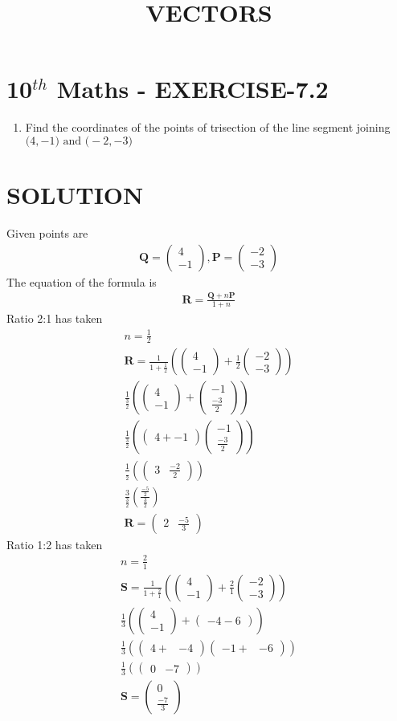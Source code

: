 \documentclass[12pt]{article}
\providecommand{\brak}[1]{\ensuremath{\left(#1\right)}}
\newcommand{\myvec}[1]{\ensuremath{\begin{pmatrix}#1\end{pmatrix}}}
\let\vec\mathbf
\begin{document}
\begin{center}
\title{\textbf{VECTORS}}
\date{\vspace{-5ex}} %
\maketitle
\end{center}

\section{10$^{th}$ Maths - EXERCISE-7.2}

\begin{enumerate}
\item Find the coordinates of the points of trisection of the line segment joining $\vec(4 ,-1) \text{ and } \vec(-2,-3)$ 
\end{enumerate}

\section{SOLUTION}
Given points are
\begin{align}
\vec{Q}=\myvec{4\\ -1} ,
\vec{P}=\myvec{-2\\ -3}
\end{align}
The equation of the formula is
\begin{align}
\vec{R}=\frac{\vec{Q}+n\vec{P}}{1+n}
\end{align}
Ratio 2:1 has taken 
\begin{align}
n=\frac{1}{2}\\
\vec{R}=\frac{1}{1+\frac{1}{2}}\brak{\myvec{4\\-1}+\frac{1}{2}\myvec{-2\\-3}}\\
\frac{1}{\frac{3}{2}}\brak{\myvec{4\\ -1}+\myvec{-1\\ \frac{-3}{2}}}\\
\frac{1}{\frac{3}{2}}\brak{\myvec{4+-1}\myvec{-1\\ \frac{-3}{2}}}\\
\frac{1}{\frac{}{2}}\brak{\myvec{3 & \frac{-2}{2}}}\\
\frac{3}{\frac{3}{2}}\brak{\frac{\frac{-5}{2}}{\frac{3}{2}}}\\
\vec{R}=\myvec{2 & \frac{-5}{3}}
\end{align}
Ratio 1:2 has taken
\begin{align}
n=\frac{2}{1}\\
\vec{S}=\frac{1}{1+\frac{2}{1}}\brak{\myvec{4\\-1}+\frac{2}{1}\myvec{-2\\-3}}\\
\frac{1}{3}\brak{\myvec{4\\ -1}+\myvec{-4-6}}\\
\frac{1}{3}\brak{\myvec{4+& -4}\myvec{-1+&-6}}\\
\frac{1}{3}\brak{\myvec{0& -7}}\\
\vec{S}=\myvec{0\\ \frac{-7}{3}}
\end{align}
\end{document}
